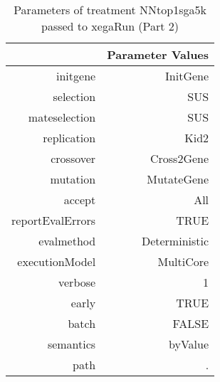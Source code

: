 \begin{table}[ht]
\centering
\begin{tabular}{rr}
  \hline
 & Parameter Values \\ 
  \hline
initgene & InitGene \\ 
  selection & SUS \\ 
  mateselection & SUS \\ 
  replication & Kid2 \\ 
  crossover & Cross2Gene \\ 
  mutation & MutateGene \\ 
  accept & All \\ 
  reportEvalErrors & TRUE \\ 
  evalmethod & Deterministic \\ 
  executionModel & MultiCore \\ 
  verbose & 1 \\ 
  early & TRUE \\ 
  batch & FALSE \\ 
  semantics & byValue \\ 
  path & . \\ 
   \hline
\end{tabular}
\caption{ Parameters of treatment NNtop1sga5k passed to xegaRun
 (Part 2)} 
\end{table}
